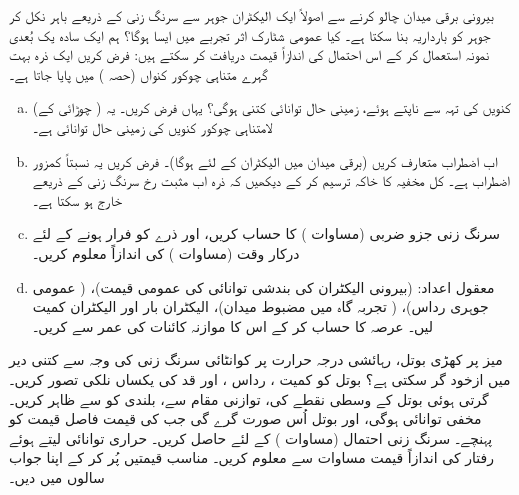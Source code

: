  بیرونی برقی میدان چالو کرنے سے اصولاً ایک الیکٹران جوہر سے سرنگ زنی کے ذریعے باہر نکل کر جوہر کو بارداریہ بنا سکتا ہے۔  کیا عمومی شٹارک اثر تجربے میں ایسا ہوگا؟ ہم ایک سادہ یک بُعدی نمونہ استعمال کر کے اس احتمال کی اندازاً قیمت دریافت کر سکتے ہیں: فرض کریں ایک ذرہ بہت گہرے متناہی چوکور کنواں (حصہ ) میں پایا جاتا ہے۔
\begin{enumerate}[a.]
\item
 کنویں کی تہہ سے ناپتے ہوئے، زمینی حال توانائی کتنی ہوگی؟ یہاں  فرض کریں۔  یہ (  چوڑائی کے) لامتناہی چوکور کنویں کی زمینی حال توانائی ہے۔
\item
 اب اضطراب  متعارف کریں (برقی میدان  میں الیکٹران کے لئے  ہوگا)۔ فرض کریں یہ نسبتاً کمزور اضطراب  ہے۔ کل مخفیہ کا خاکہ ترسیم کر کے دیکھیں کہ ذرہ اب مثبت  رخ سرنگ زنی کے ذریعے خارج ہو سکتا ہے۔
\item
 سرنگ زنی جزو ضربی  (مساوات ) کا حساب کریں، اور ذرے کو فرار ہونے کے لئے درکار وقت (مساوات ) کی اندازاً معلوم کریں۔  
\item
 معقول اعداد:  (بیرونی الیکٹران کی بندشی توانائی کی عمومی قیمت)،  ( عمومی جوہری رداس)،  ( تجربہ گاہ میں مضبوط میدان)، الیکٹران بار  اور الیکٹران کمیت  لیں۔ عرصہ  کا حساب کر کے اس کا موازنہ کائنات کی عمر سے کریں۔
 \end{enumerate}
میز پر کھڑی بوتل، رہائشی درجہ حرارت پر کوانٹائی سرنگ زنی کی وجہ سے کتنی دیر میں ازخود گر سکتی ہے؟  بوتل کو کمیت ، رداس ، اور قد  کی یکساں نلکی تصور کریں۔ گرتی ہوئی بوتل کے وسطی نقطے کی، توازنی مقام  سے، بلندی کو  سے ظاہر کریں۔ مخفی توانائی  ہوگی، اور بوتل اُس صورت گرے گی جب  کی قیمت فاصل قیمت  کو پہنچے۔ سرنگ زنی احتمال (مساوات )  کے لئے حاصل کریں۔ حراری توانائی  لیتے ہوئے رفتار کی اندازاً قیمت مساوات  سے معلوم کریں۔ مناسب قیمتیں پُر کر کے اپنا جواب سالوں میں دیں۔

